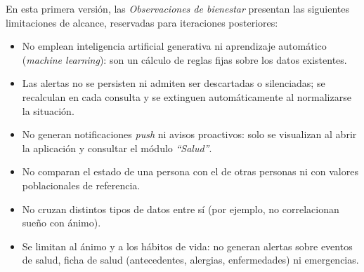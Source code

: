 \documentclass[a4paper,12pt]{article}
\begin{document}
    \par En esta primera versión, las \textit{Observaciones de bienestar} presentan las siguientes limitaciones de alcance, reservadas para iteraciones posteriores:
    \begin{itemize}
        \item No emplean inteligencia artificial generativa ni aprendizaje automático (\textit{machine learning}): son un cálculo de reglas fijas sobre los datos existentes.
        \item Las alertas no se persisten ni admiten ser descartadas o silenciadas; se recalculan en cada consulta y se extinguen automáticamente al normalizarse la situación.
        \item No generan notificaciones \textit{push} ni avisos proactivos: solo se visualizan al abrir la aplicación y consultar el módulo \textit{``Salud''}.
        \item No comparan el estado de una persona con el de otras personas ni con valores poblacionales de referencia.
        \item No cruzan distintos tipos de datos entre sí (por ejemplo, no correlacionan sueño con ánimo).
        \item Se limitan al ánimo y a los hábitos de vida: no generan alertas sobre eventos de salud, ficha de salud (antecedentes, alergias, enfermedades) ni emergencias.
    \end{itemize}
\end{document}
